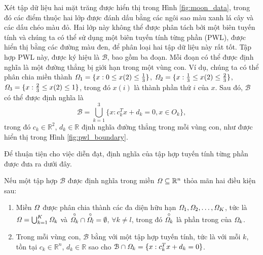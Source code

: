 Xét tập dữ liệu hai mặt trăng được hiển thị trong Hình \ref{fig:moon_data}, trong đó các điểm thuộc hai lớp được đánh dấu bằng các ngôi sao màu xanh lá cây và các dấu chéo màu đỏ. Hai lớp này không thể được phân tách bởi một biên tuyến tính và chúng ta có thể sử dụng một biên tuyến tính từng phần (PWL), được hiển thị bằng các đường màu đen, để phân loại hai tập dữ liệu này rất tốt. Tập hợp PWL này, được ký hiệu là \( \mathcal{B} \), bao gồm ba đoạn. Mỗi đoạn có thể được định nghĩa là một đường thẳng bị giới hạn trong một vùng con. Ví dụ, chúng ta có thể phân chia miền thành \( \mathit{\Omega}_1 = \{ x : 0 \leq x(2) \leq \frac{1}{3} \} \), \( \mathit{\Omega}_2 = \{ x : \frac{1}{3} \leq x(2) \leq \frac{2}{3} \} \), \( \mathit{\Omega}_3 = \{ x : \frac{2}{3} \leq x(2) \leq 1 \} \), trong đó \( x(i) \) là thành phần thứ \( i \) của \( x \). Sau đó, \( \mathcal{B} \) có thể được định nghĩa là
\[
\mathcal{B} = \bigcup_{k=1}^{3} \{ x : c_k^T x + d_k = 0, x \in O_k \},
\]
trong đó \( c_k \in \mathbb{R}^2 \), \( d_k \in \mathbb{R} \) định nghĩa đường thẳng trong mỗi vùng con, như được hiển thị trong Hình \ref{fig:pwl_boundary}.

Để thuận tiện cho việc diễn đạt, định nghĩa của tập hợp tuyến tính từng phần được đưa ra dưới đây.

\begin{define}
    Nếu một tập hợp $\mathcal{B}$ được định nghĩa trong miền \( \mathit{\Omega} \subseteq \mathbb{R}^n \) thỏa mãn hai điều kiện sau:
    \begin{enumerate}[label=(\roman*)]
        \item Miền $\mathit{\Omega}$ được phân chia thành các đa diện hữu hạn \( \mathit{\Omega}_1, \mathit{\Omega}_2, \ldots, \mathit{\Omega}_K \), tức là \( \mathit{\Omega} = \bigcup_{k=1}^{K} \mathit{\Omega}_k \) và \( \overset{\circ}{\mathit{\Omega}_k} \cap \overset{\circ}{\mathit{\Omega}_l}= \emptyset \), \( \forall k \neq l \), trong đó \( \overset{\circ}{\mathit{\Omega}_k} \) là phần trong của \( \mathit{\Omega}_k \).
        \item  Trong mỗi vùng con, \( \mathcal{B} \) bằng với một tập hợp tuyến tính, tức là với mỗi \( k \), tồn tại \( c_k \in \mathbb{R}^n \), \( d_k \in \mathbb{R} \) sao cho \( \mathcal{B} \cap \mathit{\Omega}_k = \{ x : c_k^T x + d_k = 0 \} \).
    \end{enumerate}
    \label{def:pwl_set}
\end{define}

